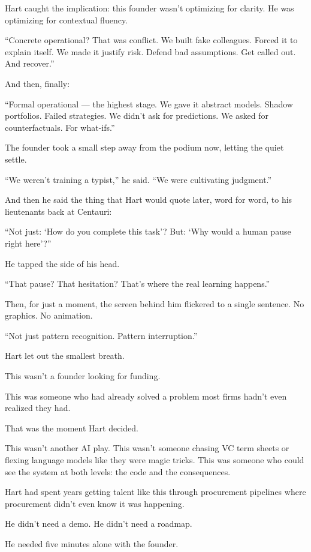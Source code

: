 Hart caught the implication: this founder wasn’t optimizing for clarity. 
He was optimizing for contextual fluency.

``Concrete operational? 
That was conflict. 
We built fake colleagues. 
Forced it to explain itself. 
We made it justify risk. 
Defend bad assumptions. 
Get called out. 
And recover.''

And then, finally:

``Formal operational — the highest stage. 
We gave it abstract models. 
Shadow portfolios. 
Failed strategies. 
We didn’t ask for predictions. 
We asked for counterfactuals. 
For what-ifs.''

The founder took a small step away from the podium now, letting the quiet settle.

``We weren’t training a typist,'' he said. ``We were cultivating judgment.''

And then he said the thing that Hart would quote later, word for word, to his lieutenants back at Centauri:

``Not just: `How do you complete this task'? But: `Why would a human pause right here'?''

He tapped the side of his head.

``That pause? That hesitation? That’s where the real learning happens.''

Then, for just a moment, the screen behind him flickered to a single sentence. No graphics. No animation.

``Not just pattern recognition. Pattern interruption.''

Hart let out the smallest breath.

This wasn’t a founder looking for funding.

This was someone who had already solved a problem most firms hadn’t even realized they had.

That was the moment Hart decided.

This wasn’t another AI play. 
This wasn’t someone chasing VC term sheets or flexing language models like they were magic tricks. 
This was someone who could see the system at both levels: the code and the consequences.

Hart had spent years getting talent like this through procurement pipelines where procurement didn’t even 
know it was happening.

He didn’t need a demo. 
He didn’t need a roadmap.

He needed five minutes alone with the founder.

